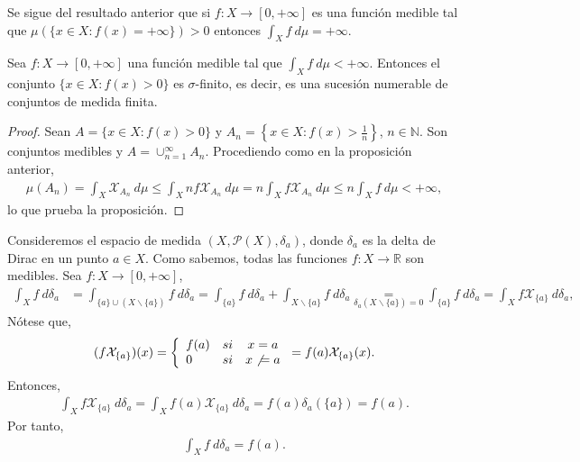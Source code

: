 \begin{obs}
    Se sigue del resultado anterior que si $f: X \longrightarrow [0,+\infty]$ es una función medible tal que $\mu(\{ x \in X : f(x) = +\infty\}) > 0$ entonces $\int_{X}{f \ d\mu} = +\infty$.
\end{obs}

\begin{prop}
    Sea $f: X \longrightarrow [0,+\infty]$ una función medible tal que $\int_{X}{f \ d\mu} < +\infty$. Entonces el conjunto $\{x \in X : f(x) > 0\}$ es $\sigma$-finito, es decir, es una sucesión numerable de conjuntos de medida finita.
\end{prop}

\begin{proof}
    Sean $A = \{x \in X : f(x) >0\}$ y $A_n = \left\{ x \in X : f(x) > \frac{1}{n}\right\}$, $n \in \mathbb{N}$. Son conjuntos medibles y $A = \cup_{n=1}^{\infty}{A_n}$. Procediendo como en la proposición anterior,
    \begin{align*}
        \mu(A_n) = \int_{X}{\mathcal{X}_{A_n} \ d\mu} \leq \int_{X}{nf\mathcal{X}_{A_n} \ d\mu} = n\int_{X}{f\mathcal{X}_{A_n} \ d\mu} \leq n\int_{X}{f \ d\mu} < +\infty,
    \end{align*}
    lo que prueba la proposición.
\end{proof}

\begin{ejemplo}
    Consideremos el espacio de medida $(X,\mathcal{P}(X),\delta_a)$, donde $\delta_a$ es la delta de Dirac en un punto $a \in X$. Como sabemos, todas las funciones $f: X \longrightarrow \mathbb{R}$ son medibles. Sea $f: X \longrightarrow [0,+\infty]$,
    \begin{align*}
        \int_{X}{f \ d\delta_a} & = \int_{\{a\}\cup(X \backslash \{a\})}{f \ d\delta_a} = \int_{\{a\}}{f \ d\delta_a} + \int_{X \backslash \{a\}}{f \ d\delta_a} \underset{\delta_a{(X \backslash \{a\}) = 0}}{=} \int_{\{a\}}{f \ d\delta_a} = \int_{X}{f\mathcal{X}_{\{a\}} \ d\delta_a},
    \end{align*}
    Nótese que,
    \begin{align*}
        (f\mathcal{X}_{\{a\}})(x) = \left\{ \begin{array}{lcc}
                                                f(a) & si & x = a        \\
                                                0    & si & x \not \ = a \\
                                            \end{array}
        \right.
        = f(a)\mathcal{X}_{\{a\}}(x).
    \end{align*}
    Entonces,
    \begin{align*}
        \int_{X}{f\mathcal{X}_{\{a\}} \ d\delta_a} = \int_{X}{f(a)\mathcal{X}_{\{a\}} \ d\delta_a} = f(a)\delta_a(\{a\}) = f(a).
    \end{align*}
    Por tanto,
    \begin{align*}
        \int_{X}{f \ d\delta_a} = f(a).
    \end{align*}
\end{ejemplo}

